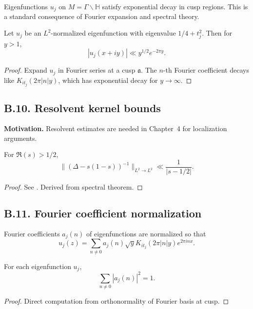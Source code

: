 \noindent
Eigenfunctions $u_j$ on $M=\Gamma\backslash\mathbb H$ satisfy exponential decay
in cusp regions. This is a standard consequence of Fourier expansion and
spectral theory.

\begin{lemma}\label{lem:cusp-decay}
Let $u_j$ be an $L^2$-normalized eigenfunction with eigenvalue $1/4+t_j^2$.
Then for $y>1$,
\[
|u_j(x+iy)| \ll y^{1/2} e^{-2\pi y}.
\]
\end{lemma}

\begin{proof}
Expand $u_j$ in Fourier series at a cusp $\mathfrak a$. The $n$-th Fourier
coefficient decays like $K_{it_j}(2\pi |n| y)$, which has exponential decay
for $y\to\infty$.
\end{proof}

\subsection*{B.10. Resolvent kernel bounds}

\noindent
\textbf{Motivation.}
Resolvent estimates are needed in Chapter~4 for localization arguments.

\begin{lemma}\label{lem:resolvent}
For $\Re(s)>1/2$,
\[
\| ( \Delta - s(1-s))^{-1} \|_{L^2\to L^2} \ll \frac{1}{|s-1/2|}.
\]
\end{lemma}

\begin{proof}
See \cite[Prop.~1.6]{Buser1992}. Derived from spectral theorem.
\end{proof}

\subsection*{B.11. Fourier coefficient normalization}

\noindent
Fourier coefficients $a_j(n)$ of eigenfunctions are normalized so that
\[
u_j(z) = \sum_{n\ne 0} a_j(n) \sqrt{y} K_{it_j}(2\pi |n| y) e^{2\pi i n x}.
\]

\begin{lemma}\label{lem:parseval}
For each eigenfunction $u_j$,
\[
\sum_{n\ne 0} |a_j(n)|^2 = 1.
\]
\end{lemma}

\begin{proof}
Direct computation from orthonormality of Fourier basis at cusp.
\end{proof}

